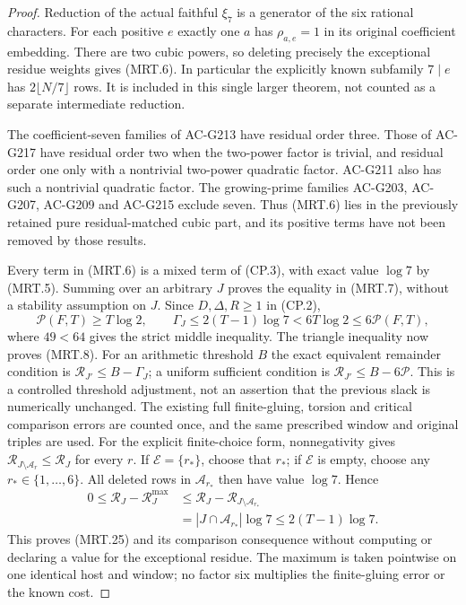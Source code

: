 \begin{proof}
Reduction of the actual faithful $\xi_7$ is a generator of the
six rational characters.  For each positive $e$ exactly one $a$
has $\rho_{a,e}=1$ in its original coefficient embedding.  There
are two cubic powers, so deleting precisely the exceptional
residue weights gives (MRT.6).  In particular the explicitly known
subfamily $7\mid e$ has $2\lfloor N/7\rfloor$ rows.  It is
included in this single larger theorem, not counted as a separate
intermediate reduction.

The coefficient-seven families of AC-G213 have residual order
three.  Those of AC-G217 have residual order two when the two-power
factor is trivial, and residual order one only with a nontrivial
two-power quadratic factor.  AC-G211 also has such a nontrivial
quadratic factor.  The growing-prime families AC-G203, AC-G207,
AC-G209 and AC-G215 exclude seven.  Thus (MRT.6) lies in the
previously retained pure residual-matched cubic part, and its
positive terms have not been removed by those results.

Every term in (MRT.6) is a mixed term of (CP.3), with exact value
$\log7$ by (MRT.5).  Summing over an arbitrary $J$ proves the
equality in (MRT.7), without a stability assumption on $J$.
Since $D,\Delta,R\geq1$ in (CP.2),
\[
 \mathcal P(F,T)\geq T\log2,\qquad
 \Gamma_J\leq2(T-1)\log7<6T\log2\leq6\mathcal P(F,T),
 \tag{MRT.23}
\]
where $49<64$ gives the strict middle inequality.
The triangle inequality now proves (MRT.8).
For an arithmetic threshold $B$ the exact equivalent remainder
condition is $\mathcal R_{J'}\leq B-\Gamma_J$; a uniform sufficient
condition is $\mathcal R_{J'}\leq B-6\mathcal P$.
This is a controlled threshold adjustment, not an assertion that
the previous slack is numerically unchanged.  The existing full
finite-gluing, torsion and critical comparison errors are counted
once, and the same prescribed window and original triples are used.
For the explicit finite-choice form, nonnegativity gives
$\mathcal R_{J\setminus\mathcal A_r}\leq\mathcal R_J$ for every $r$.
If $\mathscr E=\{r_*\}$, choose that $r_*$; if $\mathscr E$ is
empty, choose any $r_*\in\{1,\ldots,6\}$.
All deleted rows in $\mathcal A_{r_*}$ then have value $\log7$.
Hence
\[
 \begin{split}
 0\leq\mathcal R_J-\mathcal R^{\max}_J
 &\leq\mathcal R_J-\mathcal R_{J\setminus\mathcal A_{r_*}}\\
 &=|J\cap\mathcal A_{r_*}|\log7\leq2(T-1)\log7.
 \end{split}                                                   \tag{MRT.26}
\]
This proves (MRT.25) and its comparison consequence without computing
or declaring a value for the exceptional residue.  The maximum is
taken pointwise on one identical host and window; no factor six
multiplies the finite-gluing error or the known cost.


\end{proof}

